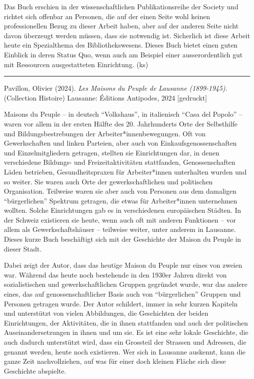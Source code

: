 \documentclass[a4paper,
fontsize=11pt,
oneside,
numbers=noperiodatend,
parskip=half-,
bibliography=totoc,
final
]{scrartcl}
\begin{document}
Das Buch erschien in der wissenschaftlichen Publikationsreihe der
Society und richtet sich offenbar an Personen, die auf der einen Seite
wohl keinen professionellen Bezug zu dieser Arbeit haben, aber auf der
anderen Seite nicht davon überzeugt werden müssen, dass sie notwendig
ist. Sicherlich ist diese Arbeit heute ein Spezialthema des
Bibliothekswesens. Dieses Buch bietet einen guten Einblick in deren
Status Quo, wenn auch am Beispiel einer ausserordentlich gut mit
Ressourcen ausgestatteten Einrichtung. (ks)

\begin{center}\rule{0.5\linewidth}{0.5pt}\end{center}

Pavillon, Olivier (2024). \emph{Les Maisons du Peuple de Lausanne
(1899-1945).} (Collection Histoire) Lausanne: Éditions Antipodes, 2024
{[}gedruckt{]}

Maisons du Peuple -- in deutsch \enquote{Volkshaus}, in italienisch
\enquote{Casa del Popolo} -- waren vor allem in der ersten Hälfte des
20. Jahrhunderts Orte der Selbsthilfe und Bildungsbestrebungen der
Arbeiter*innenbewegungen. Oft von Gewerkschaften und linken Parteien,
aber auch von Einkaufsgenossenschaften und Einzelmitgliedern getragen,
stellten sie Einrichtungen dar, in denen verschiedene Bildungs- und
Freizeitaktivitäten stattfanden, Genossenschaften Läden betrieben,
Gesundheitspraxen für Arbeiter*innen unterhalten wurden und so weiter.
Sie waren auch Orte der gewerkschaftlichen und politischen Organisation.
Teilweise waren sie aber auch von Personen aus dem damaligen
\enquote{bürgerlichen} Spektrum getragen, die etwas für Arbeiter*innen
unternehmen wollten. Solche Einrichtungen gab es in verschiedenen
europäischen Städten. In der Schweiz existieren sie heute, wenn auch oft
mit anderen Funktionen -- vor allem als Gewerkschaftshäuser -- teilweise
weiter, unter anderem in Lausanne. Dieses kurze Buch beschäftigt sich
mit der Geschichte der Maison du Peuple in dieser Stadt.

Dabei zeigt der Autor, dass das heutige Maison du Peuple nur eines von
zweien war. Während das heute noch bestehende in den 1930er Jahren
direkt von sozialistischen und gewerkschaftlichen Gruppen gegründet
wurde, war das andere eines, das auf genossenschaftlicher Basis auch von
\enquote{bürgerlichen} Gruppen und Personen getragen wurde. Der Autor
schildert, immer in sehr kurzen Kapiteln und unterstützt von vielen
Abbildungen, die Geschichten der beiden Einrichtungen, der Aktivitäten,
die in ihnen stattfanden und auch der politischen Auseinandersetzungen
in ihnen und um sie. Es ist eine sehr lokale Geschichte, die auch
dadurch unterstützt wird, dass ein Grossteil der Strassen und Adressen,
die genannt werden, heute noch existieren. Wer sich in Lausanne
auskennt, kann die ganze Zeit nachvollziehen, auf was für einer doch
kleinen Fläche sich diese Geschichte abspielte.
\end{document}
